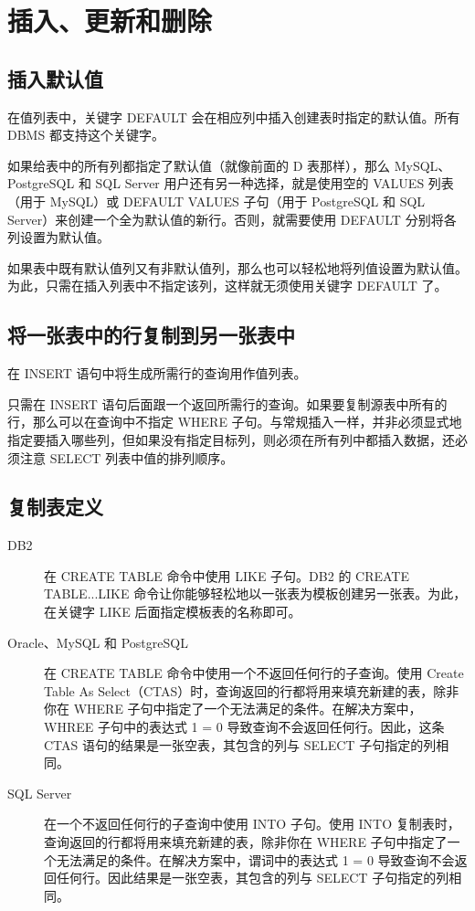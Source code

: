 \chapter{插入、更新和删除}
\section{插入默认值}
在值列表中，关键字 DEFAULT 会在相应列中插入创建表时指定的默认值。所有 DBMS 都支持这个关键字。

如果给表中的所有列都指定了默认值（就像前面的 D 表那样），那么 MySQL、PostgreSQL 和 SQL Server 用户还有另一种选择，就是使用空的 VALUES 列表（用于 MySQL）或 DEFAULT VALUES 子句（用于 PostgreSQL 和 SQL Server）来创建一个全为默认值的新行。否则，就需要使用 DEFAULT 分别将各列设置为默认值。

如果表中既有默认值列又有非默认值列，那么也可以轻松地将列值设置为默认值。为此，只需在插入列表中不指定该列，这样就无须使用关键字 DEFAULT 了。
\section{将一张表中的行复制到另一张表中}
在 INSERT 语句中将生成所需行的查询用作值列表。

只需在 INSERT 语句后面跟一个返回所需行的查询。如果要复制源表中所有的行，那么可以在查询中不指定 WHERE 子句。与常规插入一样，并非必须显式地指定要插入哪些列，但如果没有指定目标列，则必须在所有列中都插入数据，还必须注意 SELECT 列表中值的排列顺序。

\section{复制表定义}
\begin{description}
    \item[DB2] 在 CREATE TABLE 命令中使用 LIKE 子句。DB2 的 CREATE TABLE...LIKE 命令让你能够轻松地以一张表为模板创建另一张表。为此，在关键字 LIKE 后面指定模板表的名称即可。
    \item[Oracle、MySQL 和 PostgreSQL] 在 CREATE TABLE 命令中使用一个不返回任何行的子查询。使用 Create Table As Select（CTAS）时，查询返回的行都将用来填充新建的表，除非你在 WHERE 子句中指定了一个无法满足的条件。在解决方案中，WHREE 子句中的表达式 1 = 0 导致查询不会返回任何行。因此，这条 CTAS 语句的结果是一张空表，其包含的列与 SELECT 子句指定的列相同。
    \item[SQL Server] 在一个不返回任何行的子查询中使用 INTO 子句。使用 INTO 复制表时，查询返回的行都将用来填充新建的表，除非你在 WHERE 子句中指定了一个无法满足的条件。在解决方案中，谓词中的表达式 1 = 0 导致查询不会返回任何行。因此结果是一张空表，其包含的列与 SELECT 子句指定的列相同。
\end{description}
